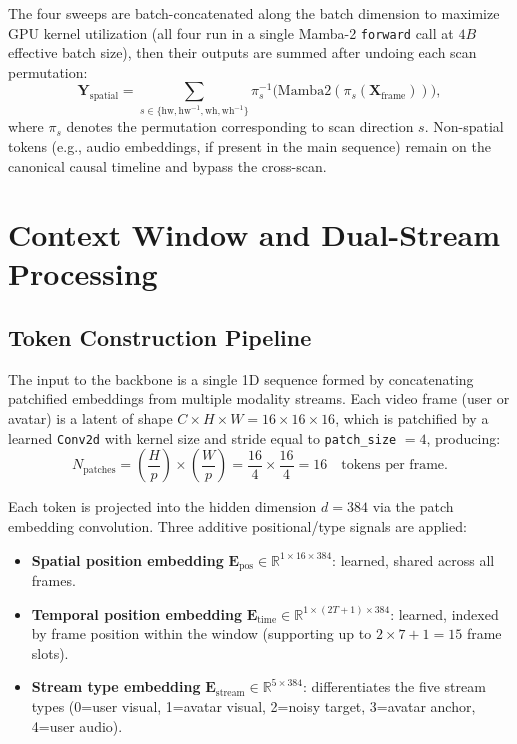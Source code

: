 \documentclass[12pt,letterpaper]{report}
\begin{document}
The four sweeps are batch-concatenated along the batch dimension to maximize
GPU kernel utilization (all four run in a single Mamba-2 \texttt{forward} call
at $4B$ effective batch size), then their outputs are summed after undoing each
scan permutation:
%
\begin{equation}\label{eq:cross-scan}
    \mathbf{Y}_{\mathrm{spatial}} = \sum_{s \in \{\mathrm{hw}, \mathrm{hw}^{-1}, \mathrm{wh}, \mathrm{wh}^{-1}\}}
        \pi_s^{-1}\bigl(\mathrm{Mamba2}(\pi_s(\mathbf{X}_{\mathrm{frame}}))\bigr),
\end{equation}
%
where $\pi_s$ denotes the permutation corresponding to scan direction $s$.
Non-spatial tokens (e.g., audio embeddings, if present in the main sequence)
remain on the canonical causal timeline and bypass the cross-scan. %

\section{Context Window and Dual-Stream Processing}\label{sec:context-window}

\subsection{Token Construction Pipeline}

The input to the backbone is a single 1D sequence formed by concatenating
patchified embeddings from multiple modality streams. Each video frame (user
or avatar) is a latent of shape $C \times H \times W = 16 \times 16 \times 16$,
which is patchified by a learned \texttt{Conv2d} with kernel size and stride
equal to \texttt{patch\_size} $= 4$, producing:
%
\begin{equation}\label{eq:patches}
    N_{\mathrm{patches}} = \left(\frac{H}{p}\right) \times \left(\frac{W}{p}\right)
    = \frac{16}{4} \times \frac{16}{4} = 16
    \quad \text{tokens per frame.}
\end{equation}

Each token is projected into the hidden dimension $d=384$ via the patch
embedding convolution. Three additive positional/type signals are applied: %

\begin{itemize}
    \item \textbf{Spatial position embedding}
        $\mathbf{E}_{\mathrm{pos}} \in \mathbb{R}^{1 \times 16 \times 384}$:
        learned, shared across all frames.
    \item \textbf{Temporal position embedding}
        $\mathbf{E}_{\mathrm{time}} \in \mathbb{R}^{1 \times (2T+1) \times 384}$:
        learned, indexed by frame position within the window (supporting up to
        $2 \times 7 + 1 = 15$ frame slots).
    \item \textbf{Stream type embedding}
        $\mathbf{E}_{\mathrm{stream}} \in \mathbb{R}^{5 \times 384}$:
        differentiates the five stream types (0=user visual, 1=avatar visual,
        2=noisy target, 3=avatar anchor, 4=user audio).
\end{itemize}
\end{document}

